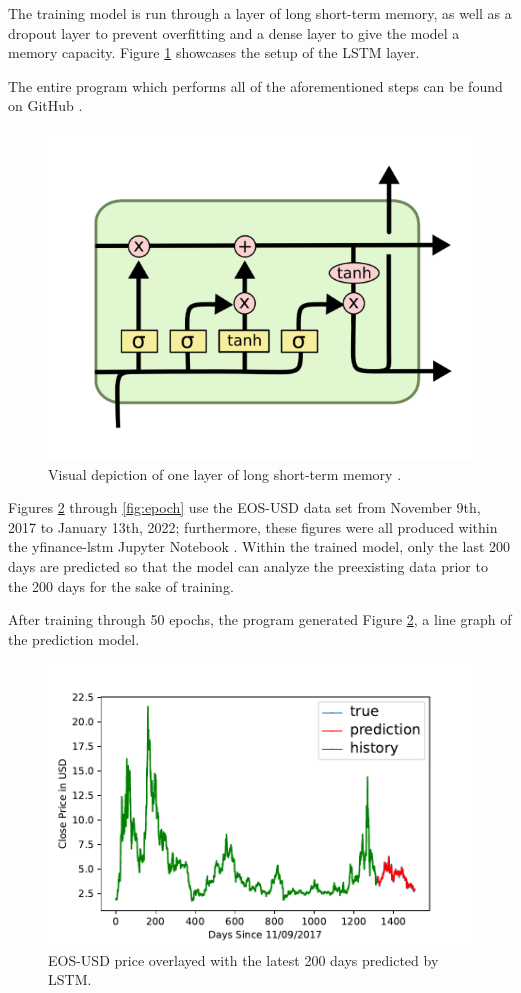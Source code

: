 The training model is run through a layer of long short-term memory, as well as a dropout layer to prevent overfitting and a dense layer to give the model a memory capacity. Figure \ref{fig:alstm} showcases the setup of the LSTM layer.

The entire program which performs all of the aforementioned steps can be found on GitHub \cite{c13}.

\begin{figure}[htb]
\includegraphics[width=0.5\columnwidth]{images/lstm.png}
\caption{Visual depiction of one layer of long short-term memory \cite{c9}.}
\label{fig:alstm}
\end{figure}

Figures \ref{fig:prediction-model} through \ref{fig:epoch} use the EOS-USD data set from November 9th, 2017 to January 13th, 2022; furthermore, these figures were all produced within the yfinance-lstm Jupyter Notebook \cite{c13}. Within the trained model, only the last 200 days are predicted so that the model can analyze the preexisting data prior to the 200 days for the sake of training.

After training through 50 epochs, the program generated Figure \ref{fig:prediction-model}, a line graph of the prediction model.

\begin{figure}[htb]
\includegraphics[width=\columnwidth]{images/EOS-USD-prediction-model.pdf}
\caption{EOS-USD price overlayed with the latest 200 days predicted by LSTM.}
\label{fig:prediction-model}
\end{figure}

